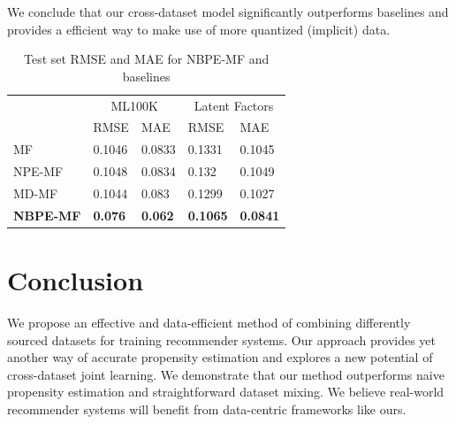 \documentclass{article}
\begin{document}
We conclude that our cross-dataset model significantly outperforms baselines and provides a efficient way to make use of more quantized (implicit) data. 

\begin{table}
  \caption{Test set RMSE and MAE for NBPE-MF and baselines}
  \label{sample-table}
  \centering
  \begin{tabular}{lllll}
    \toprule               
                     & \multicolumn{2}{c}{ML100K} & \multicolumn{2}{c}{Latent Factors}                                     \\
    \cmidrule(r){2-5}
                     & RMSE                       & MAE                                & RMSE            & MAE             \\
    \midrule
    MF               & 0.1046                     & 0.0833                             & 0.1331          & 0.1045          \\ 
    NPE-MF           & 0.1048                     & 0.0834                             & 0.132           & 0.1049          \\ 
    MD-MF            & 0.1044                     & 0.083                              & 0.1299          & 0.1027          \\
    \textbf{NBPE-MF} & \textbf{0.076}             & \textbf{0.062}                     & \textbf{0.1065} & \textbf{0.0841} \\ 
    \bottomrule
  \end{tabular}
\end{table}

\section{Conclusion}
We propose an effective and data-efficient method of combining differently sourced datasets for training recommender systems. Our approach provides yet another way of accurate propensity estimation and explores a new potential of cross-dataset joint learning. We demonstrate that our method outperforms naive propensity estimation and straightforward dataset mixing. We believe real-world recommender systems will benefit from data-centric frameworks like ours.




\end{document}
